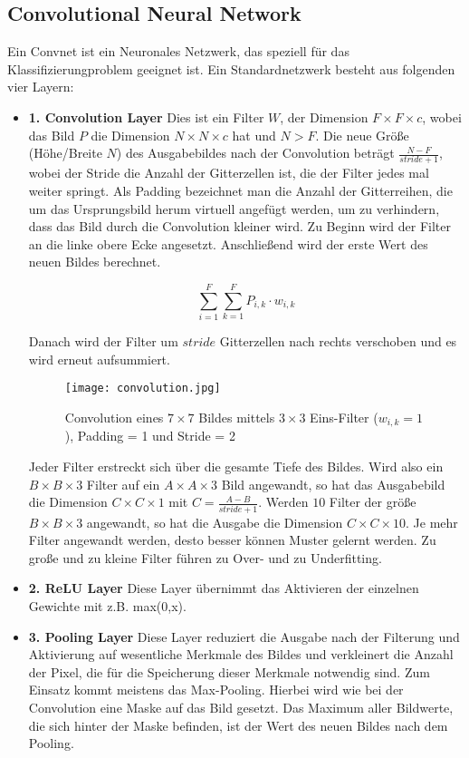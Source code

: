 \documentclass[11pt,ceqn]{book}
\begin{document}
\subsection{Convolutional Neural Network}
Ein Convnet ist ein Neuronales Netzwerk, das speziell für das Klassifizierungproblem geeignet ist. Ein Standardnetzwerk besteht aus folgenden vier Layern:

\begin{itemize}
\item \textbf{1. Convolution Layer} Dies ist ein Filter $W$, der Dimension $F \times F\times c$, wobei das Bild $P$ die Dimension $N\times N\times c$ hat und $N>F$. Die neue Größe (Höhe/Breite $N$) des Ausgabebildes nach der Convolution beträgt $\frac{N-F}{stride+1}$, wobei der Stride die Anzahl der Gitterzellen ist, die der Filter jedes mal weiter springt. Als Padding bezeichnet man die Anzahl der Gitterreihen, die um das Ursprungsbild herum virtuell angefügt werden, um zu verhindern, dass das Bild durch die Convolution kleiner wird. Zu Beginn wird der Filter an die linke obere Ecke angesetzt. Anschließend wird der erste Wert des neuen Bildes berechnet.

\[\sum_{i=1}^F \sum_{k=1}^F{P_{i,k} \cdot w_{i,k}}\]

Danach wird der Filter um $stride$ Gitterzellen nach rechts verschoben und es wird erneut aufsummiert.

\begin{figure}[H]
\centering
\texttt{[image: convolution.jpg]}
\caption{Convolution eines $7 \times 7$ Bildes mittels $3 \times 3$ Eins-Filter ($w_{i,k} = 1$), Padding = 1 und Stride = 2}
\end{figure}

Jeder Filter erstreckt sich über die gesamte Tiefe des Bildes. Wird also ein $B\times B\times 3$ Filter auf ein $A\times A\times 3$ Bild angewandt, so hat das Ausgabebild die Dimension $C\times C\times 1$ mit $C = \frac{A-B}{stride+1}$. Werden $10$ Filter der größe $B\times B\times 3$ angewandt, so hat die Ausgabe die Dimension $C\times C\times 10$. Je mehr Filter angewandt werden, desto besser können Muster gelernt werden. Zu große und zu kleine Filter führen zu Over- und zu Underfitting.

\item \textbf{2. ReLU Layer} Diese Layer übernimmt das Aktivieren der einzelnen Gewichte mit z.B. max(0,x).

\item \textbf{3. Pooling Layer} Diese Layer reduziert die Ausgabe nach der Filterung und Aktivierung auf wesentliche Merkmale des Bildes und verkleinert die Anzahl der Pixel, die für die Speicherung dieser Merkmale notwendig sind. Zum Einsatz kommt meistens das Max-Pooling. Hierbei wird wie bei der Convolution eine Maske auf das Bild gesetzt. Das Maximum aller Bildwerte, die sich hinter der Maske befinden, ist der Wert des neuen Bildes nach dem Pooling. 


\end{itemize}
\end{document}
